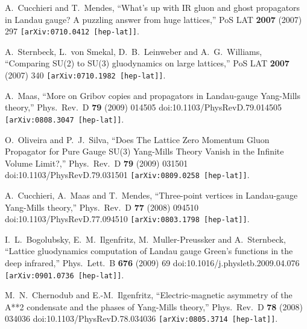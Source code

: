 \documentclass[a4paper,11pt,british,twosides]{book}%
\numberwithin{equation}{section}
\begin{document}
\begin{thebibliography}{9}
  A.~Cucchieri and T.~Mendes,
  ``What's up with IR gluon and ghost propagators in Landau gauge? A puzzling answer from huge
  lattices,''
  PoS LAT {\bf 2007} (2007) 297
  {\tt [arXiv:0710.0412 [hep-lat]]}.

  A.~Sternbeck, L.~von Smekal, D.~B.~Leinweber and A.~G.~Williams,
  ``Comparing SU(2) to SU(3) gluodynamics on large lattices,''
  PoS LAT {\bf 2007} (2007) 340
  {\tt [arXiv:0710.1982 [hep-lat]]}.

  A.~Maas,
  ``More on Gribov copies and propagators in Landau-gauge Yang-Mills theory,''
  Phys.\ Rev.\ D {\bf 79} (2009) 014505
  doi:10.1103/PhysRevD.79.014505
  {\tt [arXiv:0808.3047 [hep-lat]]}.

  O.~Oliveira and P.~J.~Silva,
  ``Does The Lattice Zero Momentum Gluon Propagator for Pure Gauge SU(3) Yang-Mills Theory
  Vanish in the Infinite Volume Limit?,''
  Phys.\ Rev.\ D {\bf 79} (2009) 031501
  doi:10.1103/PhysRevD.79.031501
  {\tt[arXiv:0809.0258 [hep-lat]]}.

  A.~Cucchieri, A.~Maas and T.~Mendes,
  ``Three-point vertices in Landau-gauge Yang-Mills theory,''
  Phys.\ Rev.\ D {\bf 77} (2008) 094510
  doi:10.1103/PhysRevD.77.094510
  {\tt [arXiv:0803.1798 [hep-lat]]}.

  I.~L.~Bogolubsky, E.~M.~Ilgenfritz, M.~Muller-Preussker and A.~Sternbeck,
  ``Lattice gluodynamics computation of Landau gauge Green's functions in the deep infrared,''
  Phys.\ Lett.\ B {\bf 676} (2009) 69
  doi:10.1016/j.physletb.2009.04.076
  {\tt [arXiv:0901.0736 [hep-lat]]}.

  M.~N.~Chernodub and E.-M.~Ilgenfritz,
  ``Electric-magnetic asymmetry of the A**2 condensate and the phases of Yang-Mills theory,''
  Phys.\ Rev.\ D {\bf 78} (2008) 034036
  doi:10.1103/PhysRevD.78.034036
  {\tt [arXiv:0805.3714 [hep-lat]]}.



\end{thebibliography}
\end{document}
